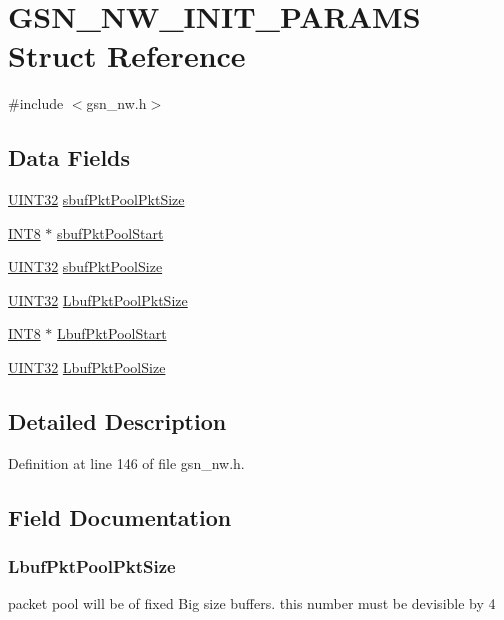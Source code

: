 \hypertarget{a00165}{
\section{GSN\_\-NW\_\-INIT\_\-PARAMS Struct Reference}
\label{a00165}
}


{\ttfamily \#include $<$gsn\_\-nw.h$>$}

\subsection*{Data Fields}
\begin{DoxyCompactItemize}
\item 
\hyperlink{a00660_gae1e6edbbc26d6fbc71a90190d0266018}{UINT32} \hyperlink{a00165_a42386fb051a55ad1c912c6cab2f5aae4}{sbufPktPoolPktSize}
\item 
\hyperlink{a00660_ga307b8734c020247f6bac4fcde0dcfbb9}{INT8} $\ast$ \hyperlink{a00165_a48ee92559c5235d053bb798c92e469eb}{sbufPktPoolStart}
\item 
\hyperlink{a00660_gae1e6edbbc26d6fbc71a90190d0266018}{UINT32} \hyperlink{a00165_a0972f4539914c0e91b5da2561ab4eefa}{sbufPktPoolSize}
\item 
\hyperlink{a00660_gae1e6edbbc26d6fbc71a90190d0266018}{UINT32} \hyperlink{a00165_a3acb08aea3a6eb76474385d92513ffb6}{LbufPktPoolPktSize}
\item 
\hyperlink{a00660_ga307b8734c020247f6bac4fcde0dcfbb9}{INT8} $\ast$ \hyperlink{a00165_a0341b72d92e2eade898dcac939f80ab7}{LbufPktPoolStart}
\item 
\hyperlink{a00660_gae1e6edbbc26d6fbc71a90190d0266018}{UINT32} \hyperlink{a00165_abe315d85e0bbf81d2568542b0f985562}{LbufPktPoolSize}
\end{DoxyCompactItemize}


\subsection{Detailed Description}


Definition at line 146 of file gsn\_\-nw.h.



\subsection{Field Documentation}
\hypertarget{a00165_a3acb08aea3a6eb76474385d92513ffb6}{
\subsubsection[{LbufPktPoolPktSize}]{ {\bf LbufPktPoolPktSize}}}
\label{a00165_a3acb08aea3a6eb76474385d92513ffb6}
packet pool will be of fixed Big size buffers. this number must be devisible by 4 

